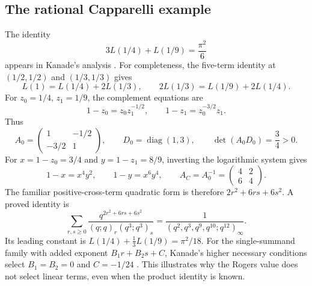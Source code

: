 \documentclass[11pt,reqno]{amsart}
\theoremstyle{remark}
\numberwithin{equation}{section}
\begin{document}
\subsection{The rational Capparelli example}
The identity
\begin{equation}\label{eq:cappdilog}
 3L(1/4)+L(1/9)=\frac{\pi^2}{6}
\end{equation}
appears in Kanade's analysis \cite[Section~3]{Kanade}. For completeness,
the five-term identity at $(1/2,1/2)$ and $(1/3,1/3)$ gives
\[
 L(1)=L(1/4)+2L(1/3),\qquad
 2L(1/3)=L(1/9)+2L(1/4).
\]
For $z_0=1/4$, $z_1=1/9$, the complement equations are
\[
 1-z_0=z_0z_1^{-1/2},\qquad 1-z_1=z_0^{-3/2}z_1.
\]
Thus
\[
 A_0=\begin{pmatrix}1&-1/2\\-3/2&1\end{pmatrix},\qquad
 D_0=\operatorname{diag}(1,3),\qquad \det(A_0D_0)=\frac34>0.
\]
For $x=1-z_0=3/4$ and $y=1-z_1=8/9$, inverting the logarithmic
system gives
\[
 1-x=x^4y^2,\qquad 1-y=x^6y^4,\qquad
 A_C=A_0^{-1}=\begin{pmatrix}4&2\\6&4\end{pmatrix}.
\]
The familiar positive-cross-term quadratic form is therefore
$2r^2+6rs+6s^2$. A proved identity is \cite{Kanade,KursungozCapp}
\begin{equation}\label{eq:cappsum}
 \sum_{r,s\geq0}\frac{q^{2r^2+6rs+6s^2}}{(q;q)_r(q^3;q^3)_s}
 =\frac1{(q^2,q^3,q^9,q^{10};q^{12})_\infty}.
\end{equation}
Its leading constant is
$L(1/4)+\tfrac13L(1/9)=\pi^2/18$.
For the single-summand family with added exponent $B_1r+B_2s+C$,
Kanade's higher necessary conditions select $B_1=B_2=0$ and $C=-1/24$
\cite[Section~3]{Kanade}. This illustrates why the Rogers value does not
select linear terms, even when the product identity is known.
\end{document}
